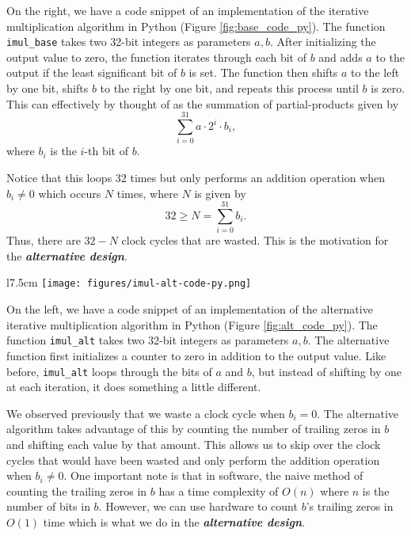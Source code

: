 \documentclass[10pt]{article}
\newcommand{\alternative}[0]{\textit{\textbf{alternative design}}}
\begin{document}
	\noindent On the right, we have a code snippet of an implementation of the iterative multiplication algorithm in Python (Figure \ref{fig:base_code_py}). The function \texttt{imul\_base} takes two 32-bit integers as parameters $a,b$. After initializing the output value to zero, the function iterates through each bit of $b$ and adds $a$ to the output if the least significant bit of $b$ is set. The function then shifts $a$ to the left by one bit, shifts $b$ to the right by one bit, and repeats this process until $b$ is zero. This can effectively by thought of as the summation of partial-products given by
	$$\sum_{i=0}^{31} a \cdot 2^i \cdot b_i,$$
	where $b_i$ is the $i$-th bit of $b$.

	\pagebreak

	\noindent Notice that this loops 32 times but only performs an addition operation when $b_i\not=0$ which occurs $N$ times, where $N$ is given by 
	$$32\geq N = \sum_{i=0}^{31} b_i.$$
	Thus, there are $32-N$ clock cycles that are wasted. This is the motivation for the \alternative.

	\begin{wrapfigure}{l}{7.5cm}
		\texttt{[image: figures/imul-alt-code-py.png]} 
		\caption{Python Implementation of the Alternative Iterative Multiplication Algorithm}
		\label{fig:alt_code_py}
	\end{wrapfigure} 

	\noindent On the left, we have a code snippet of an implementation of the alternative iterative multiplication algorithm in Python (Figure \ref{fig:alt_code_py}). The function \texttt{imul\_alt} takes two 32-bit integers as parameters $a,b$. The alternative function first initializes a counter to zero in addition to the output value. Like before, \texttt{imul\_alt} loops through the bits of $a$ and $b$, but instead of shifting by one at each iteration, it does something a little different.
	
	\noindent We observed previously that we waste a clock cycle when $b_i=0$. The alternative algorithm takes advantage of this by counting the number of trailing zeros in $b$ and shifting each value by that amount. This allows us to skip over the clock cycles that would have been wasted and only perform the addition operation when $b_i\not=0$. One important note is that in software, the naive method of counting the trailing zeros in $b$ has a time complexity of $O(n)$ where $n$ is the number of bits in $b$. However, we can use hardware to count $b$'s trailing zeros in $O(1)$ time which is what we do in the \alternative.
\end{document}
